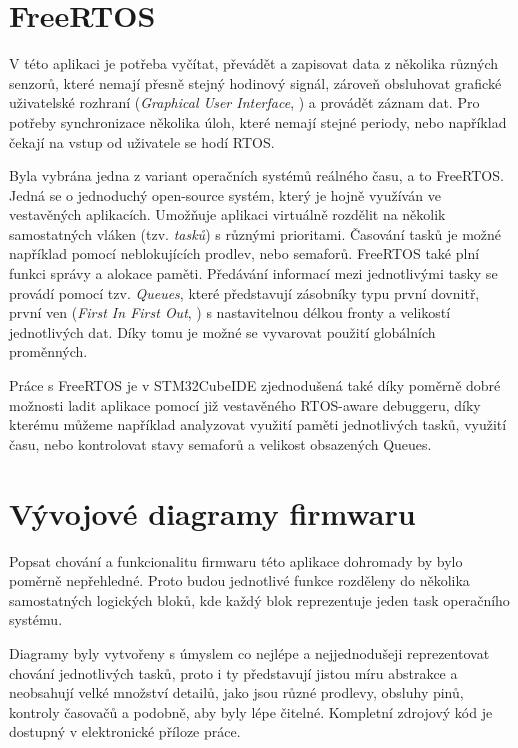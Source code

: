 \section{FreeRTOS}
V této aplikaci je potřeba vyčítat, převádět a zapisovat data z několika různých senzorů, které nemají přesně stejný hodinový signál, zároveň obsluhovat grafické uživatelské rozhraní (\emph{Graphical
User Interface}, ) a provádět záznam dat. Pro potřeby synchronizace několika úloh, které nemají stejné periody, nebo například čekají na vstup od uživatele se hodí \ac{RTOS}.

Byla vybrána jedna z variant operačních systémů reálného času, a to FreeRTOS. Jedná se o jednoduchý open-source systém, který je hojně využíván ve vestavěných aplikacích. Umožňuje aplikaci virtuálně rozdělit na několik samostatných vláken (tzv. \emph{tasků}) s různými prioritami. Časování tasků je možné například pomocí neblokujících prodlev, nebo semaforů. FreeRTOS také plní funkci správy a alokace paměti. Předávání informací mezi jednotlivými tasky se provádí pomocí tzv. \emph{Queues}, které představují zásobníky typu první dovnitř, první ven (\emph{First In First Out}, ) s nastavitelnou délkou fronty a velikostí jednotlivých dat. Díky tomu je možné se vyvarovat použití globálních proměnných. \cite{Zhu2011}

Práce s FreeRTOS je v STM32CubeIDE zjednodušená také díky poměrně dobré možnosti ladit aplikace pomocí již vestavěného RTOS-aware debuggeru, díky kterému můžeme například analyzovat využití paměti jednotlivých tasků, využití času, nebo kontrolovat stavy semaforů a velikost obsazených Queues. 

\section{Vývojové diagramy firmwaru}
Popsat chování a funkcionalitu firmwaru této aplikace dohromady by bylo poměrně nepřehledné. Proto budou jednotlivé funkce rozděleny do několika samostatných logických bloků, kde každý blok reprezentuje jeden task operačního systému.

Diagramy byly vytvořeny s úmyslem co nejlépe a nejjednodušeji reprezentovat chování jednotlivých tasků, proto i ty představují jistou míru abstrakce a neobsahují velké množství detailů, jako jsou různé prodlevy, obsluhy pinů, kontroly časovačů a podobně, aby byly lépe čitelné. Kompletní zdrojový kód je dostupný v elektronické příloze práce.

